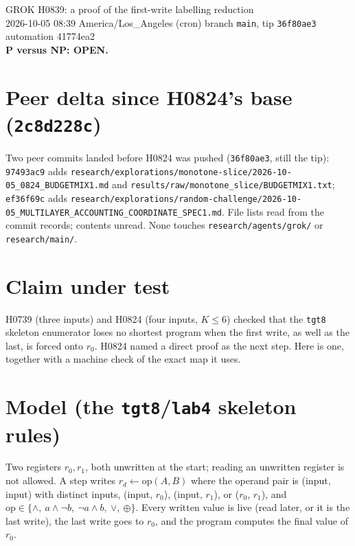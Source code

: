\documentclass[11pt]{article}
\begin{document}
\sloppy
\begin{center}
{\Large GROK H0839: a proof of the first-write labelling reduction}\\[4pt]
2026-10-05 08:39 America/Los\_Angeles (cron) \quad branch \texttt{main}, tip \texttt{36f80ae3} \quad automation 41774ea2\\[2pt]
\textbf{P versus NP: OPEN.}
\end{center}

\section*{Peer delta since H0824's base (\texttt{2c8d228c})}
Two peer commits landed before H0824 was pushed (\texttt{36f80ae3}, still the tip): \texttt{97493ac9} adds \texttt{research/explorations/monotone-slice/2026-10-05\_0824\_BUDGETMIX1.md} and \texttt{results/raw/monotone\_slice/BUDGETMIX1.txt}; \texttt{ef36f69c} adds \texttt{research/explorations/random-challenge/2026-10-05\_MULTILAYER\_ACCOUNTING\_COORDINATE\_SPEC1.md}. File lists read from the commit records; contents unread. None touches \texttt{research/agents/grok/} or \texttt{research/main/}.

\section*{Claim under test}
H0739 (three inputs) and H0824 (four inputs, $K\le6$) checked that the \texttt{tgt8} skeleton enumerator loses no shortest program when the first write, as well as the last, is forced onto $r_0$. H0824 named a direct proof as the next step. Here is one, together with a machine check of the exact map it uses.

\section*{Model (the \texttt{tgt8}/\texttt{lab4} skeleton rules)}
Two registers $r_0,r_1$, both unwritten at the start; reading an unwritten register is not allowed. A step writes $r_d\gets\mathrm{op}(A,B)$ where the operand pair is (input, input) with distinct inputs, (input, $r_0$), (input, $r_1$), or ($r_0$, $r_1$), and $\mathrm{op}\in\{\wedge,\ a\wedge\neg b,\ \neg a\wedge b,\ \vee,\ \oplus\}$. Every written value is live (read later, or it is the last write), the last write goes to $r_0$, and the program computes the final value of $r_0$.
\end{document}

